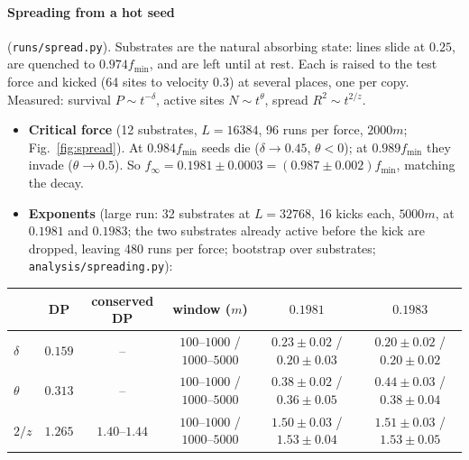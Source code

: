 \documentclass[10pt,a4paper]{article}
\begin{document}
\paragraph{Spreading from a hot seed} (\texttt{runs/spread.py}). Substrates are the natural absorbing state: lines slide at $0.25$, are quenched to $0.974f_{\min}$, and are left until at rest. Each is raised to the test force and kicked (64 sites to velocity $0.3$) at several places, one per copy. Measured: survival $P\sim t^{-\delta}$, active sites $N\sim t^\theta$, spread $R^2\sim t^{2/z}$.
\begin{itemize}
\item \textbf{Critical force} (12 substrates, $L=16384$, 96 runs per force, $2000m$; Fig.~\ref{fig:spread}). At $0.984f_{\min}$ seeds die ($\delta\to0.45$, $\theta<0$); at $0.989f_{\min}$ they invade ($\theta\to0.5$). So $f_\infty=0.1981\pm0.0003=(0.987\pm0.002)f_{\min}$, matching the decay.
\item \textbf{Exponents} (large run: 32 substrates at $L=32768$, 16 kicks each, $5000m$, at $0.1981$ and $0.1983$; the two substrates already active before the kick are dropped, leaving 480 runs per force; bootstrap over substrates; \texttt{analysis/spreading.py}):
\end{itemize}
\begin{center}\small
\begin{tabular}{lccccc}
\toprule
 & DP & conserved DP & window ($m$) & $0.1981$ & $0.1983$ \\
\midrule
$\delta$ & $0.159$ & -- & $100$--$1000$ / $1000$--$5000$ & $0.23\pm0.02$ / $0.20\pm0.03$ & $0.20\pm0.02$ / $0.20\pm0.02$ \\
$\theta$ & $0.313$ & -- & $100$--$1000$ / $1000$--$5000$ & $0.38\pm0.02$ / $0.36\pm0.05$ & $0.44\pm0.03$ / $0.38\pm0.04$ \\
$2/z$ & $1.265$ & $1.40$--$1.44$ & $100$--$1000$ / $1000$--$5000$ & $1.50\pm0.03$ / $1.53\pm0.04$ & $1.51\pm0.03$ / $1.53\pm0.05$ \\
\bottomrule
\end{tabular}
\end{center}
\end{document}
